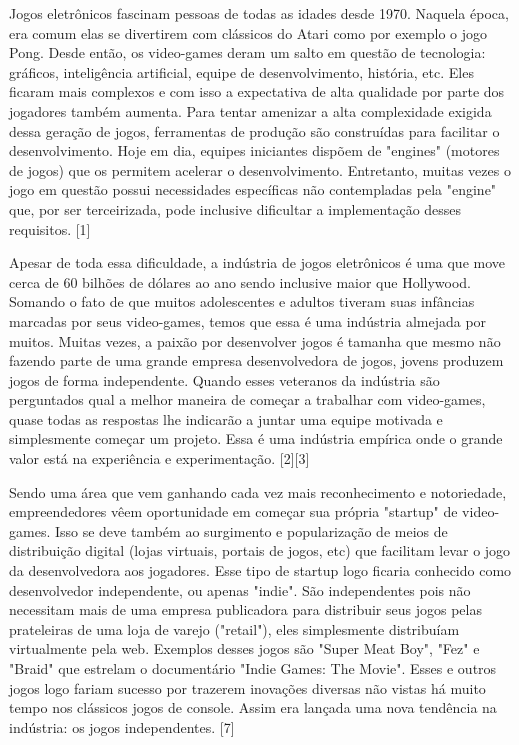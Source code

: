 Jogos eletrônicos fascinam pessoas de todas as idades desde 1970. Naquela época, era comum elas se divertirem com clássicos do Atari como por exemplo o jogo Pong. Desde então, os video-games deram um salto em questão de tecnologia: gráficos, inteligência artificial, equipe de desenvolvimento, história, etc. Eles ficaram mais complexos e com isso a expectativa de alta qualidade por parte dos jogadores também aumenta. Para tentar amenizar a alta complexidade exigida dessa geração de jogos, ferramentas de produção são construídas para facilitar o desenvolvimento. Hoje em dia, equipes iniciantes dispõem de "engines" (motores de jogos) que os permitem acelerar o desenvolvimento. Entretanto, muitas vezes o jogo em questão possui necessidades específicas não contempladas pela "engine" que, por ser terceirizada, pode inclusive dificultar a implementação desses requisitos. [1]

Apesar de toda essa dificuldade, a indústria de jogos eletrônicos é uma que move cerca de 60 bilhões de dólares ao ano sendo inclusive maior que Hollywood. Somando o fato de que muitos adolescentes e adultos tiveram suas infâncias marcadas por seus video-games, temos que essa é uma indústria almejada por muitos. Muitas vezes, a paixão por desenvolver jogos é tamanha que mesmo não fazendo parte de uma grande empresa desenvolvedora de jogos, jovens produzem jogos de forma independente. Quando esses veteranos da indústria são perguntados qual a melhor maneira de começar a trabalhar com video-games, quase todas as respostas lhe indicarão a juntar uma equipe motivada e simplesmente começar um projeto. Essa é uma indústria empírica onde o grande valor está na experiência e experimentação. [2][3]

Sendo uma área que vem ganhando cada vez mais reconhecimento e notoriedade, empreendedores vêem oportunidade em começar sua própria "startup" de video-games. Isso se deve também ao surgimento e popularização de meios de distribuição digital (lojas virtuais, portais de jogos, etc) que facilitam levar o jogo da desenvolvedora aos jogadores. Esse tipo de startup logo ficaria conhecido como desenvolvedor independente, ou apenas "indie". São independentes pois não necessitam mais de uma empresa publicadora para distribuir seus jogos pelas prateleiras de uma loja de varejo ("retail"), eles simplesmente distribuíam virtualmente pela web. Exemplos desses jogos são "Super Meat Boy", "Fez" e "Braid" que estrelam o documentário "Indie Games: The Movie". Esses e outros jogos logo fariam sucesso por trazerem inovações diversas não vistas há muito tempo nos clássicos jogos de console. Assim era lançada uma nova tendência na indústria: os jogos independentes. [7]

